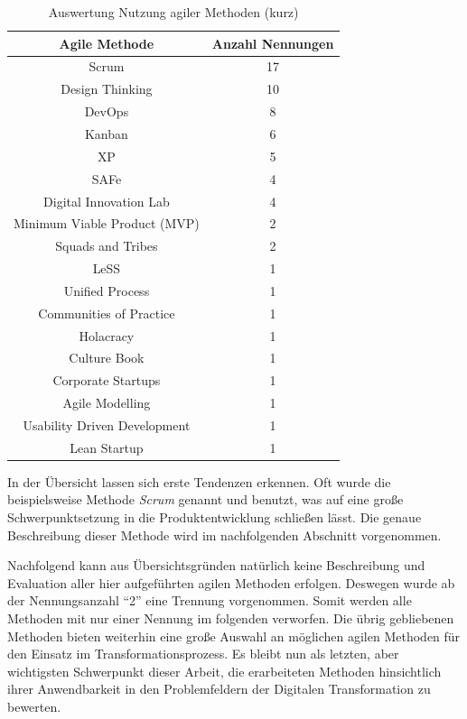 \begin{table}[ht]
	\centering
	\caption{Auswertung Nutzung agiler Methoden (kurz)}
	\begin{tabular}{|c|c|}
		\hline
		\textbf{Agile Methode}& \textbf{Anzahl Nennungen} \\
		\hline
		Scrum                          & 17               \\
		Design Thinking                & 10               \\
		DevOps                         & 8                \\
		Kanban                         & 6                \\
		XP                             & 5                \\
		SAFe                           & 4                \\
		Digital Innovation Lab         & 4                \\
		Minimum Viable Product (MVP) & 2                \\
		Squads and Tribes              & 2                \\
		LeSS                           & 1                \\
		Unified Process                & 1                \\
		Communities of Practice        & 1                \\
		Holacracy                      & 1                \\
		Culture Book                   & 1                \\
		Corporate Startups             & 1                \\
		Agile Modelling                & 1                \\
		Usability Driven Development   & 1                \\
		Lean Startup                   & 1               \\
		\hline
	\end{tabular}
	\label{tab:clusteringagileshort}
\end{table}

In der Übersicht lassen sich erste Tendenzen erkennen. Oft wurde die beispielsweise Methode \textit{Scrum} genannt und benutzt, was auf eine große Schwerpunktsetzung in die Produktentwicklung schließen lässt. Die genaue Beschreibung dieser Methode wird im nachfolgenden Abschnitt vorgenommen. 

Nachfolgend kann aus Übersichtsgründen natürlich keine Beschreibung und Evaluation aller hier aufgeführten agilen Methoden erfolgen. Deswegen wurde ab der  Nennungsanzahl ``2'' eine Trennung vorgenommen. Somit werden alle Methoden mit nur einer Nennung im folgenden verworfen. Die übrig gebliebenen Methoden bieten weiterhin eine große Auswahl an möglichen agilen Methoden für den Einsatz im Transformationsprozess. Es bleibt nun als letzten, aber wichtigsten Schwerpunkt dieser Arbeit, die erarbeiteten Methoden hinsichtlich ihrer Anwendbarkeit in den Problemfeldern der Digitalen Transformation zu bewerten.

